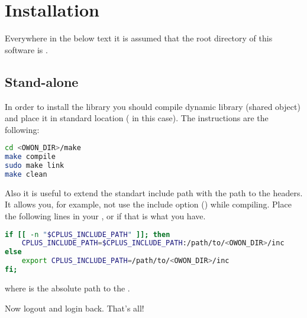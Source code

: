 \section{Installation}\label{sec:install}
Everywhere in the below text it is assumed that the root directory of this software is
.

\subsection{Stand-alone}
In order to install the library you should compile dynamic library (shared object) and
place it in standard location ( in this case). The instructions are the
following:
\begin{lstlisting}[language=bash]
cd <OWON_DIR>/make
make compile
sudo make link 
make clean
\end{lstlisting}

Also it is useful to extend the standart include path with the path to the headers. It
allows you, for example, not use the include option () while compiling. Place
the following lines in your , or  if that is
what you have.
\begin{lstlisting}[language=bash]
if [[ -n "$CPLUS_INCLUDE_PATH" ]]; then
    CPLUS_INCLUDE_PATH=$CPLUS_INCLUDE_PATH:/path/to/<OWON_DIR>/inc
else
    export CPLUS_INCLUDE_PATH=/path/to/<OWON_DIR>/inc
fi;
\end{lstlisting}
where  is the absolute path to the .

Now logout and login back. That's all!

